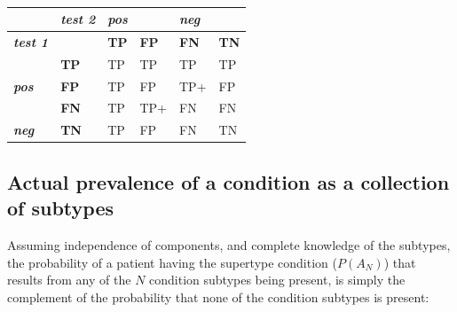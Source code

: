 \documentclass[a4paper, 12pt, twoside]{article}
\let\Oldsubsection\subsection
\renewcommand{\subsection}{\FloatBarrier\Oldsubsection}
\begin{document}
\begin{table}[]
\centering
\caption{}
\label{tab:A1}
\begin{tabular}{@{}l|l|ll|ll|@{}}
\cmidrule(l){2-6}
\textbf{}                                                     & \textit{\textbf{test 2}} & \multicolumn{2}{l|}{\textit{\textbf{pos}}} & \multicolumn{2}{l|}{\textit{\textbf{neg}}}               \\ \midrule
\multicolumn{1}{|l|}{\textit{\textbf{test 1}}}                &                          & \textbf{TP}  & \textbf{FP}                 & \textbf{FN}                 & \textbf{TN}                \\ \midrule
\multicolumn{1}{|l|}{}                                        & \textbf{TP}              & TP           & TP                          & TP                          & TP                         \\
\multicolumn{1}{|l|}{\multirow{-2}{*}{\textit{\textbf{pos}}}} & \textbf{FP}              & TP           & FP                          & \cellcolor[HTML]{FFCCC9}TP+ & FP                         \\ \midrule
\multicolumn{1}{|l|}{}                                        & \textbf{FN}              & TP           & \cellcolor[HTML]{FFCCC9}TP+ & \cellcolor[HTML]{FFFFC7}FN  & \cellcolor[HTML]{FFFFC7}FN \\
\multicolumn{1}{|l|}{\multirow{-2}{*}{\textit{\textbf{neg}}}} & \textbf{TN}              & TP           & FP                          & \cellcolor[HTML]{FFFFC7}FN  & \cellcolor[HTML]{96FFFB}TN \\ \bottomrule
\end{tabular}
\end{table}

\subsection{Actual prevalence of a condition as a collection of subtypes}

Assuming independence of components, and complete knowledge of the subtypes, the probability of a patient having the supertype   condition (\(P(A_N)\)) that results from any of the \(N\) condition subtypes being present, is simply the complement of the probability that none of the condition subtypes is present:
\end{document}
